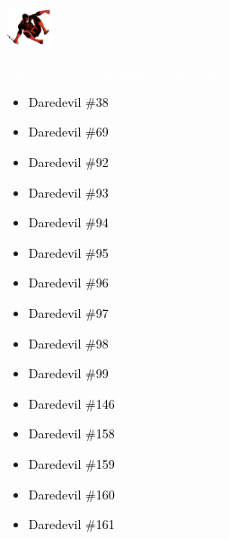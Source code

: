 \documentclass[12pt]{article}
\newcommand{\checkbox}{\raisebox{0.0ex}{\fbox{\rule{0ex}{1.5ex} \rule{1.5ex}{0ex}}}}
\begin{document}
\begin{center}
    \vspace*{2cm}
    \includegraphics[width=0.1\textwidth]{daredevil1.png}
    \vspace{0.3cm}

    {\Huge \textbf{\textcolor{white}{Daredevil Chronological Checklist}}}
\end{center}

\vspace{0.3cm}
\noindent
\begin{tcolorbox}[
  colback=white!95!gray,
  colframe=black,
  width=\textwidth,
  arc=4mm,
  auto outer arc,
  boxrule=0.8pt,
  left=8pt,right=8pt,top=8pt,bottom=8pt
]
\begin{itemize}[left=0pt,label={\checkbox}]
    \item \textcolor{black}{Daredevil \#38}
    \item \textcolor{black}{Daredevil \#69}
    \item \textcolor{black}{Daredevil \#92}
    \item \textcolor{black}{Daredevil \#93}
    \item \textcolor{black}{Daredevil \#94}
    \item \textcolor{black}{Daredevil \#95}
    \item \textcolor{black}{Daredevil \#96}
    \item \textcolor{black}{Daredevil \#97}
    \item \textcolor{black}{Daredevil \#98}
    \item \textcolor{black}{Daredevil \#99}
    \item \textcolor{black}{Daredevil \#146}
    \item \textcolor{black}{Daredevil \#158}
    \item \textcolor{black}{Daredevil \#159}
    \item \textcolor{black}{Daredevil \#160}
    \item \textcolor{black}{Daredevil \#161}
\end{itemize}
\end{tcolorbox}

\newpage
{}
\end{document}
